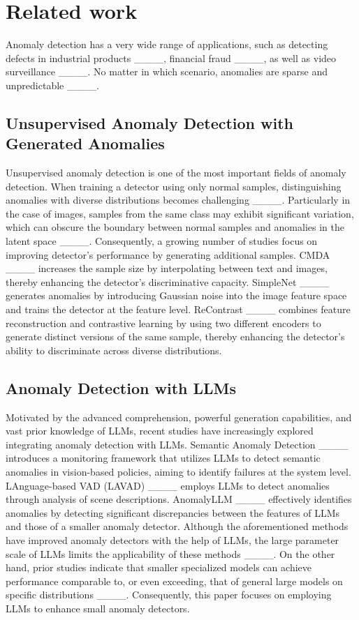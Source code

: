 \section{Related work}
\label{sec:RW}

Anomaly detection has a very wide range of applications, such as detecting defects in industrial products ____, financial fraud ____, as well as video surveillance ____. No matter in which scenario, anomalies are sparse and unpredictable ____. 


\subsection{Unsupervised Anomaly Detection with Generated Anomalies}
Unsupervised anomaly detection is one of the most important fields of anomaly detection. When training a detector using only normal samples, distinguishing anomalies with diverse distributions becomes challenging ____. Particularly in the case of images, samples from the same class may exhibit significant variation, which can obscure the boundary between normal samples and anomalies in the latent space ____. 
Consequently, a growing number of studies focus on improving detector's performance by generating additional samples.
CMDA ____ increases the sample size by interpolating between text and images, thereby enhancing the detector's discriminative capacity.
SimpleNet ____ generates anomalies by introducing Gaussian noise into the image feature space and trains the detector at the feature level.
ReContrast ____ combines feature reconstruction and contrastive learning by using two different encoders to generate distinct versions of the same sample, thereby enhancing the detector's ability to discriminate across diverse distributions.
\subsection{Anomaly Detection with LLMs}
Motivated by the advanced comprehension, powerful generation capabilities, and vast prior knowledge of LLMs, recent studies have increasingly explored integrating anomaly detection with LLMs.
Semantic Anomaly Detection ____ introduces a monitoring framework that utilizes LLMs to detect semantic anomalies in vision-based policies, aiming to identify failures at the system level.
LAnguage-based VAD (LAVAD) ____ employs LLMs to detect anomalies through analysis of scene descriptions. 
AnomalyLLM ____ effectively identifies anomalies by detecting significant discrepancies between the features of LLMs and those of a smaller anomaly detector. Although the aforementioned methods have improved anomaly detectors with the help of LLMs, the large parameter scale of LLMs limits the applicability of these methods ____.
On the other hand, prior studies indicate that smaller specialized models can achieve performance comparable to, or even exceeding, that of general large models on specific distributions ____. Consequently, this paper focuses on employing LLMs to enhance small anomaly detectors.

